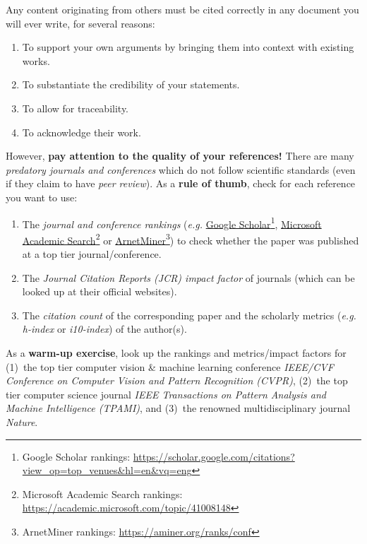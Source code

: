 \documentclass[11pt,a4paper]{article}
\begin{document}
Any content originating from others must be cited correctly in any document you will ever write, for several reasons:
\begin{enumerate}
  \item To support your own arguments by bringing them into context with existing works.
  \item To substantiate the credibility of your statements.
  \item To allow for traceability.
  \item To acknowledge their work.
\end{enumerate}
However, \textbf{pay attention to the quality of your references!}
There are many \emph{predatory journals and conferences} which do not follow scientific standards (even if they claim to have \emph{peer review}). As a \textbf{rule of thumb}, check for each reference you want to use:
\begin{enumerate}
  \item The \emph{journal and conference rankings} (\emph{e.g.} \href{https://scholar.google.com/citations?view_op=top_venues&hl=en&vq=eng}{Google Scholar}\footnote{Google Scholar rankings: \url{https://scholar.google.com/citations?view_op=top_venues&hl=en&vq=eng}}, \href{https://academic.microsoft.com/topic/41008148}{Microsoft Academic Search}\footnote{Microsoft Academic Search rankings: \url{https://academic.microsoft.com/topic/41008148}} or \href{https://aminer.org/ranks/conf}{ArnetMiner}\footnote{ArnetMiner rankings: \url{https://aminer.org/ranks/conf}}) to check whether the paper was published at a top tier journal/conference.
  \item The \emph{Journal Citation Reports (JCR) impact factor} of journals (which can be looked up at their official websites). 
  \item The \emph{citation count} of the corresponding paper and the scholarly metrics (\emph{e.g.} \emph{h-index} or \emph{i10-index}) of the author(s).
\end{enumerate}
As a \textbf{warm-up exercise}, look up the rankings and metrics/impact factors for (1)~the top tier computer vision \& machine learning conference \emph{IEEE/CVF Conference on Computer Vision and Pattern Recognition (CVPR)}, (2)~the top tier computer science journal \emph{IEEE Transactions on Pattern Analysis and Machine Intelligence (TPAMI)}, and (3)~the renowned multidisciplinary journal \emph{Nature}.
\end{document}
